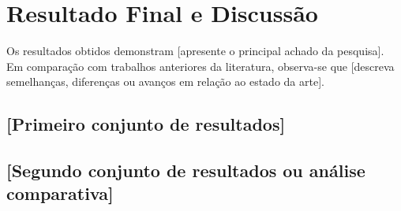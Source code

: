 \section{Resultado Final e Discussão}


Os resultados obtidos demonstram [apresente o principal achado da pesquisa].
Em comparação com trabalhos anteriores da literatura, observa-se que
[descreva semelhanças, diferenças ou avanços em relação ao estado da arte].

\subsection{[Primeiro conjunto de resultados]}


\subsection{[Segundo conjunto de resultados ou análise comparativa]}

